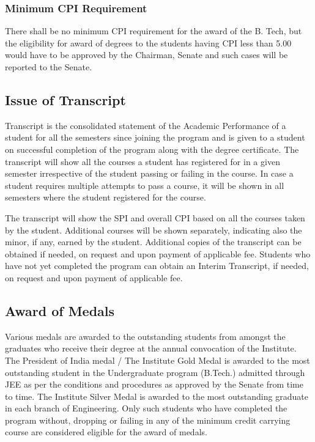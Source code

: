 \subsubsection{Minimum CPI Requirement}

There shall be no minimum CPI requirement for the award of the B. Tech, but the eligibility for award of degrees to the students having CPI less than 5.00 would have to be approved by the Chairman, Senate and such cases will be reported to the Senate. 

\subsection{Issue of Transcript}

Transcript is the consolidated statement of the Academic Performance of a student for all the semesters since joining the program and is given to a student on successful completion of the program along with the degree certificate.
The transcript will show all the courses a student has registered for in a given semester irrespective of the student passing or failing in the course. In case a student requires multiple attempts to pass a course, it will be shown in all semesters where the student registered for the course.

The transcript will show the SPI and overall CPI based on all the courses taken by the student. Additional courses will be shown separately, indicating also the minor, if any, earned by the student. Additional copies of the transcript can be obtained if needed, on request and upon payment of applicable fee. Students who have not yet completed the program can obtain an Interim Transcript, if needed, on request and upon payment of applicable fee.

\subsection{Award of Medals}

Various medals are awarded to the outstanding students from amongst the graduates who receive their degree at the annual convocation of the Institute. The President of India medal / The Institute Gold Medal is awarded to the most outstanding student in the Undergraduate program (B.Tech.) admitted through JEE as per the conditions and procedures as approved by the Senate from time to time. The Institute Silver Medal is awarded to the most outstanding graduate in each branch of Engineering. Only such students who have completed the program without, dropping or failing in any of the minimum credit carrying course are considered eligible for the award of medals.